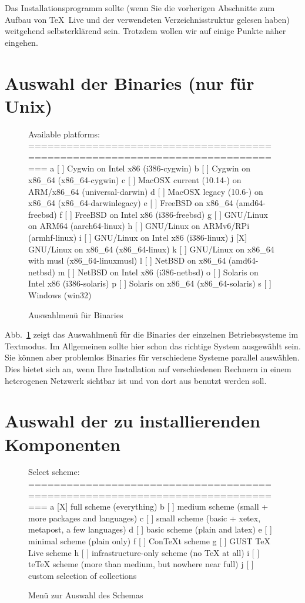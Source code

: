 \documentclass[12pt,ngerman,a4paper,fullparskip]{report}
\newcommand{\TL}{\TeX\ Live\xspace}
\begin{document}
Das Installationsprogramm sollte (wenn Sie die vorherigen Abschnitte zum Aufbau von \TL und der verwendeten Verzeichnisstruktur gelesen haben) weitgehend selbsterklärend sein. Trotzdem wollen wir auf einige Punkte näher eingehen.

\section{Auswahl der Binaries (nur für Unix)}\label{sec:binary}


\begin{figure}[tb]
\begin{boxedverbatim}
Available platforms:
===============================================================================
   a [ ] Cygwin on Intel x86 (i386-cygwin)
   b [ ] Cygwin on x86_64 (x86_64-cygwin)
   c [ ] MacOSX current (10.14-) on ARM/x86_64 (universal-darwin)
   d [ ] MacOSX legacy (10.6-) on x86_64 (x86_64-darwinlegacy)
   e [ ] FreeBSD on x86_64 (amd64-freebsd)
   f [ ] FreeBSD on Intel x86 (i386-freebsd)
   g [ ] GNU/Linux on ARM64 (aarch64-linux)
   h [ ] GNU/Linux on ARMv6/RPi (armhf-linux)
   i [ ] GNU/Linux on Intel x86 (i386-linux)
   j [X] GNU/Linux on x86_64 (x86_64-linux)
   k [ ] GNU/Linux on x86_64 with musl (x86_64-linuxmusl)
   l [ ] NetBSD on x86_64 (amd64-netbsd)
   m [ ] NetBSD on Intel x86 (i386-netbsd)
   o [ ] Solaris on Intel x86 (i386-solaris)
   p [ ] Solaris on x86_64 (x86_64-solaris)
   s [ ] Windows (win32)
\end{boxedverbatim}
\caption{Auswahlmenü für Binaries}\label{fig:bin-text}
\end{figure}

\noindent Abb.~\ref{fig:bin-text} zeigt das Auswahlmenü für die Binaries der einzelnen Betriebssysteme im Textmodus. Im Allgemeinen sollte hier schon das richtige System ausgewählt sein. Sie können aber problemlos Binaries
für verschiedene Systeme parallel auswählen. Dies bietet sich an, wenn Ihre Installation auf verschiedenen Rechnern in einem heterogenen Netzwerk sichtbar ist und von dort aus benutzt werden soll.

\section{Auswahl der zu installierenden Komponenten}\label{sec:components}

\begin{figure}[tbh]
\begin{boxedverbatim}
Select scheme:
===============================================================================
 a [X] full scheme (everything)
 b [ ] medium scheme (small + more packages and languages)
 c [ ] small scheme (basic + xetex, metapost, a few languages)
 d [ ] basic scheme (plain and latex)
 e [ ] minimal scheme (plain only)
 f [ ] ConTeXt scheme
 g [ ] GUST TeX Live scheme
 h [ ] infrastructure-only scheme (no TeX at all)
 i [ ] teTeX scheme (more than medium, but nowhere near full)
 j [ ] custom selection of collections
\end{boxedverbatim}
\caption{Menü zur Auswahl des Schemas}\label{fig:scheme-text}
\end{figure}
\end{document}
